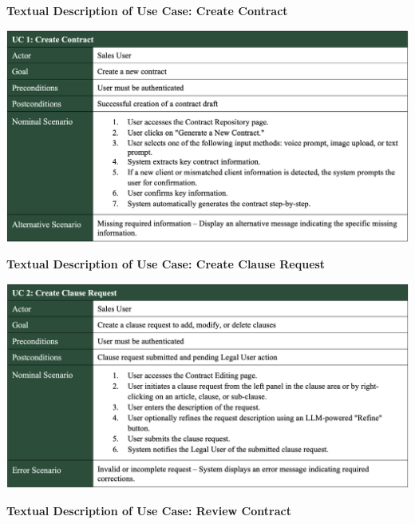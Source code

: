 \textbf{Textual Description of Use Case: Create Contract}\vspace{-0.3cm}

\begin{center}
    \centering
    \includegraphics[width=1\textwidth]{Images/Create Contract Use Case.png}
    \label{tab:create_contract_use_case}
\end{center}

\vspace{0.3cm}

\textbf{Textual Description of Use Case: Create Clause Request}\vspace{-0.3cm}

\begin{center}
    \centering
    \includegraphics[width=1\textwidth]{Images/Create Clause Request Use Case.png}
    \label{tab:create_clause_request_use_case}
\end{center}

\vspace{0.3cm}

\textbf{Textual Description of Use Case: Review Contract}\vspace{-0.3cm}

